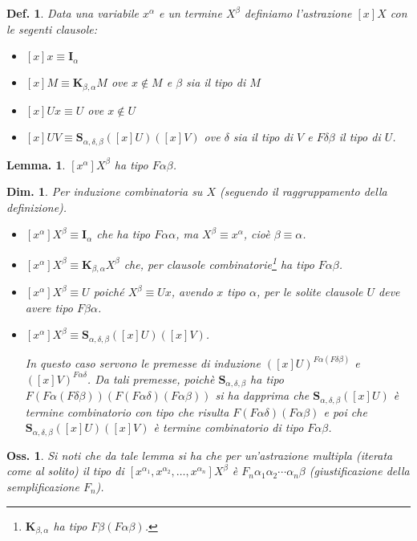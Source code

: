 \documentclass{book}
\newtheorem{definizione}{Def.}[chapter]
\newtheorem{osservazione}{Oss.}[chapter]
\newtheorem{lemma}{Lemma.}[chapter]
\newtheorem{dimostrazione}{Dim.}[chapter]
\newcommand*{\ii}{\mathbf{I}}    %
\newcommand*{\kk}{\mathbf{K}}    %
\newcommand*{\sss}{\mathbf{S}}   %
\begin{document}
\begin{definizione}
Data una variabile $x^\alpha$ e un termine $X^\beta$ definiamo l'astrazione
$[x]X$ con le segenti clausole:
\begin{itemize}
\item[-]$[x]x \equiv \ii_\alpha$
\item[-]$[x]M \equiv \kk_{\beta,\alpha}M$ ove $x \notin M$ e $\beta$ sia il 
  tipo di $M$
\item[-]$[x]Ux \equiv U$ ove $x \notin U$
\item[-]$[x]UV \equiv \sss_{\alpha,\delta,\beta}([x]U)([x]V)$ ove $\delta$
  sia il tipo di $V$ e $F\delta\beta$ il tipo di $U$.
\end{itemize}
\end{definizione}

\begin{lemma}
$[x^\alpha ]X^\beta$ ha tipo $F\alpha\beta$.
\end{lemma}
\begin{dimostrazione}
Per induzione combinatoria su $X$ (seguendo il raggruppamento della 
definizione).
\begin{itemize}
\item[a)]$[x^\alpha]X^\beta \equiv \ii_\alpha$ che ha tipo $F\alpha\alpha$,
  ma $X^\beta \equiv x^\alpha$, cio\`e $\beta \equiv \alpha$.
\item[b)]$[x^\alpha]X^\beta \equiv \kk_{\beta,\alpha}X^\beta$ che, per clausole
  combinatorie\footnote{$\kk_{\beta,\alpha}$ ha tipo $F\beta(F\alpha\beta)$.}
  ha tipo $F\alpha\beta$.
\item[c)]$[x^\alpha]X^\beta \equiv U$ poich\'e $X^\beta \equiv Ux$, avendo $x$ 
  tipo
  $\alpha$, per le solite clausole $U$ deve avere tipo $F\beta\alpha$.
\item[d)]$[x^\alpha]X^\beta \equiv \sss_{\alpha,\delta,\beta}([x]U)([x]V)$.

 In questo caso ser\-vo\-no le premesse di induzione 
 $([x]U)^{F\alpha(F\delta\beta)}$ e $([x]V)^{F\alpha\delta}$. Da tali premesse,
 poich\`e $\sss_{\alpha,\delta,\beta}$ ha tipo $F(F\alpha(F\delta\beta))
 (F(F\alpha\delta)(F\alpha\beta))$ si ha dapprima che 
 $\sss_{\alpha,\delta,\beta}([x]U)$ \`e termine combinatorio con tipo che 
 risulta $F(F\alpha\delta)(F\alpha\beta)$ e poi che 
 $\sss_{\alpha,\delta,\beta}([x]U)([x]V)$ \`e termine combinatorio di tipo
 $F\alpha\beta$.
\end{itemize}
\end{dimostrazione}

\begin{osservazione}
Si noti che da tale lemma si ha che per un'astrazione multipla (iterata come
al solito) il tipo di $[x^{\alpha_1}, x^{\alpha_2}, \ldots, x^{\alpha_n}]
X^\beta$ \`e $F_n \alpha_1\alpha_2\cdots\alpha_n\beta$ (giustificazione della 
semplificazione $F_n$).
\end{osservazione}
\end{document}
